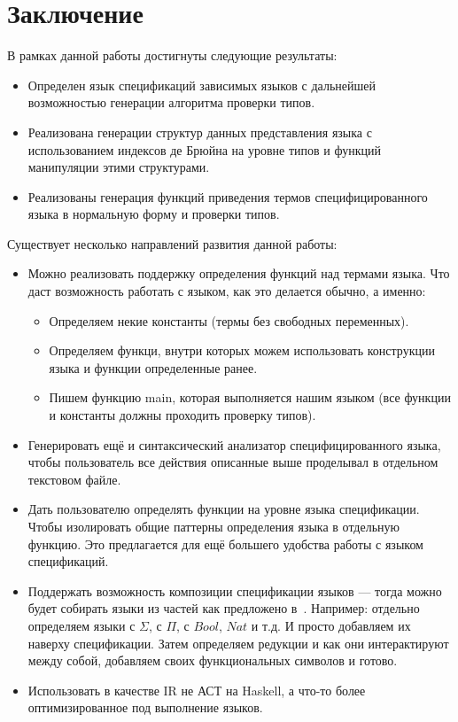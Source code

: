 \documentclass{spbau-diploma}
\begin{document}





\section*{Заключение}

В рамках данной работы достигнуты следующие результаты:
\begin{itemize}
  \item Определен язык спецификаций зависимых языков с дальнейшей возможностью генерации алгоритма проверки типов.
  \item Реализована генерации структур данных представления языка с использованием индексов де Брюйна на уровне типов и функций манипуляции этими структурами.
  \item Реализованы генерация функций приведения термов специфицированного языка в нормальную форму и проверки типов.
\end{itemize}

Существует несколько направлений развития данной работы:
\begin{itemize}
  \item Можно реализовать поддержку определения функций над термами языка. Что даст возможность работать с языком, как это делается обычно, а именно:
  \begin{itemize}
    \item Определяем некие константы (термы без свободных переменных).
    \item Определяем функци, внутри которых можем использовать конструкции языка и функции определенные ранее.
    \item Пишем функцию main, которая выполняется нашим языком (все функции и константы должны проходить проверку типов).
  \end{itemize}
  \item Генерировать ещё и синтаксический анализатор специфицированного языка, чтобы пользователь все действия описанные выше проделывал в отдельном текстовом файле.
  \item Дать пользователю определять функции на уровне языка спецификации. Чтобы изолировать общие паттерны определения языка в отдельную функцию. Это предлагается для ещё большего удобства работы с языком спецификаций.
  \item Поддержать возможность композиции спецификации языков --- тогда можно будет собирать языки из частей как предложено в~\cite{isaev}. Например: отдельно определяем языки с $\Sigma$, с $\Pi$, с $Bool$, $Nat$ и т.д. И просто добавляем их наверху спецификации. Затем определяем редукции и как они интерактируют между собой, добавляем своих функциональных символов и готово.
  \item Использовать в качестве IR\cite{IR} не АСТ на Haskell, а что-то более оптимизированное под выполнение языков.
\end{itemize}






\end{document}
